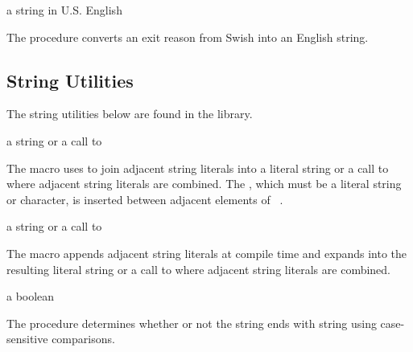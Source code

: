 \begin{procedure}
\end{procedure}
\returns{} a string in U.S. English

The  procedure converts an exit
reason from Swish into an English string.

\subsection{String Utilities}

The string utilities below are found in the  library.

\begin{syntax}
\end{syntax}
\expandsto{} a string or a call to 

The  macro uses  to join adjacent string
literals into a literal string or a call to  where adjacent
string literals are combined.
The , which must be a literal string or character, is inserted
between adjacent elements of ~\etc{}.

\begin{syntax}
\end{syntax}
\expandsto{} a string or a call to 

The  macro appends adjacent string literals
at compile time and expands into the resulting literal string or a
call to  where adjacent string literals are
combined.

\begin{procedure}
\end{procedure}
\returns{} a boolean

The  procedure determines whether or not the string
 ends with string  using case-sensitive comparisons.

